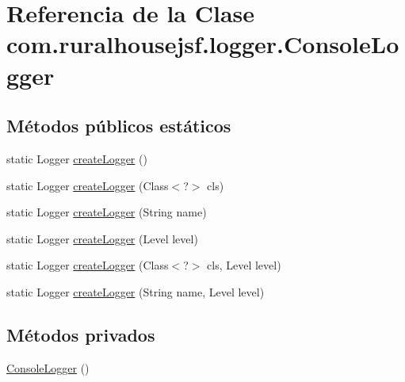 \hypertarget{classcom_1_1ruralhousejsf_1_1logger_1_1_console_logger}{}\section{Referencia de la Clase com.\+ruralhousejsf.\+logger.\+Console\+Logger}
\label{classcom_1_1ruralhousejsf_1_1logger_1_1_console_logger}
\subsection*{Métodos públicos estáticos}
\begin{DoxyCompactItemize}
\item 
static Logger \mbox{\hyperlink{classcom_1_1ruralhousejsf_1_1logger_1_1_console_logger_a520321643663e37d95761134a35505cd}{create\+Logger}} ()
\item 
static Logger \mbox{\hyperlink{classcom_1_1ruralhousejsf_1_1logger_1_1_console_logger_a7260bb499fc46999ae7c583aa7227a9e}{create\+Logger}} (Class$<$?$>$ cls)
\item 
static Logger \mbox{\hyperlink{classcom_1_1ruralhousejsf_1_1logger_1_1_console_logger_aede603ef1d6e7732ebc86740306a0d76}{create\+Logger}} (String name)
\item 
static Logger \mbox{\hyperlink{classcom_1_1ruralhousejsf_1_1logger_1_1_console_logger_ac2b1539989c5ffe217126480d0cd1d0f}{create\+Logger}} (Level level)
\item 
static Logger \mbox{\hyperlink{classcom_1_1ruralhousejsf_1_1logger_1_1_console_logger_aff02e8e2cb59129f6cd218d251f999af}{create\+Logger}} (Class$<$?$>$ cls, Level level)
\item 
static Logger \mbox{\hyperlink{classcom_1_1ruralhousejsf_1_1logger_1_1_console_logger_ab24910a5c796c6dd0a686067a856febd}{create\+Logger}} (String name, Level level)
\end{DoxyCompactItemize}
\subsection*{Métodos privados}
\begin{DoxyCompactItemize}
\item 
\mbox{\hyperlink{classcom_1_1ruralhousejsf_1_1logger_1_1_console_logger_a51a46eb118739bc4e500b3f257ca170e}{Console\+Logger}} ()
\end{DoxyCompactItemize}
